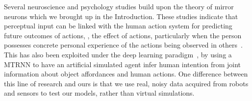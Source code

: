 Several neuroscience and psychology studies build upon the theory of mirror neurons which we brought up in the Introduction. These studies indicate that perceptual input can be linked with the human action system for predicting future outcomes of actions, \ie, the effect of actions, particularly when the person possesses concrete personal experience of the actions being observed in others~\cite{aglioti:2008:basketball,knoblich:2001:psychsci}. This has also been exploited under the deep learning paradigm~\cite{kim:2017:nn}, by using a \ac{MTRNN} to have an artificial simulated agent infer human intention from joint information about object affordances and human actions. One difference between this line of research and ours is that we use real, noisy data acquired from robots and sensors to test our models, rather than virtual simulations.
